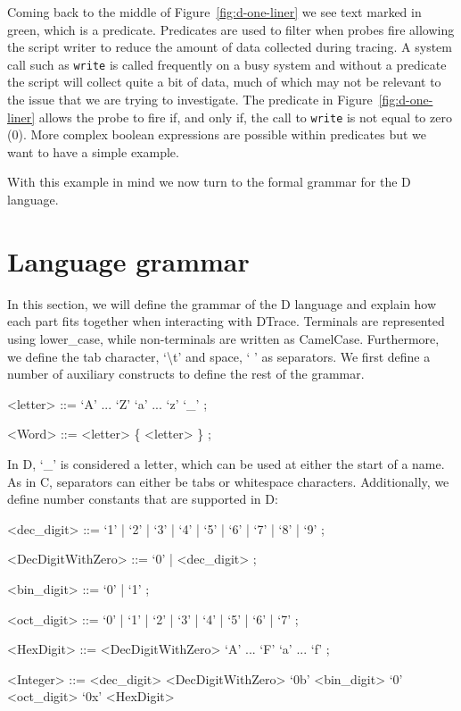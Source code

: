 Coming back to the middle of Figure~\ref{fig:d-one-liner} we see text
marked in green, which is a predicate.  Predicates are used to filter
when probes fire allowing the script writer to reduce the amount of
data collected during tracing.  A system call such as \texttt{write}
is called frequently on a busy system and without a predicate the
script will collect quite a bit of data, much of which may not be
relevant to the issue that we are trying to investigate.  The
predicate in Figure~\ref{fig:d-one-liner} allows the probe to fire if,
and only if, the call to \texttt{write} is not equal to zero (0).
More complex boolean expressions are possible within predicates but we
want to have a simple example.

With this example in mind we now turn to the formal grammar for the D
language.

\section{Language grammar}
\label{sec:grammar}

\setlength{\grammarparsep}{5pt plus 1pt minus 1pt} %
\setlength{\grammarindent}{12em} %

%



In this section, we will define the grammar of the D language and explain how
each part fits together when interacting with DTrace. Terminals are represented
using lower\_case, while non-terminals are written as CamelCase. Furthermore, we
define the tab character, `\textbackslash t' and space, ` ' as separators. We first
define a number of auxiliary constructs to define the rest of the grammar.

\begin{grammar}
<letter> ::= `A' ... `Z'
	\alt `a' ... `z'
	\alt `\_' ;

<Word> ::= <letter> \{ <letter> \} ;
\end{grammar}

\noindent
In D, `\_' is considered a letter, which can be used at either the start of a
name. As in C, separators can either be tabs or whitespace characters.
Additionally, we define number constants that are supported in D:

\begin{grammar}
<dec\_digit> ::= `1' | `2' | `3' | `4' | `5' | `6' | `7' | `8' | `9' ;

<DecDigitWithZero> ::= `0' | <dec\_digit> ;

<bin\_digit> ::= `0' | `1' ;

<oct\_digit> ::= `0' | `1' | `2' | `3' | `4' | `5' | `6' | `7' ;

<HexDigit> ::= <DecDigitWithZero>
	\alt `A' ... `F'
	\alt `a' ... `f' ;

<Integer> ::= <dec\_digit> <DecDigitWithZero>
	\alt `0b' <bin\_digit>
	\alt `0' <oct\_digit>
	\alt `0x' <HexDigit>
\end{grammar}

